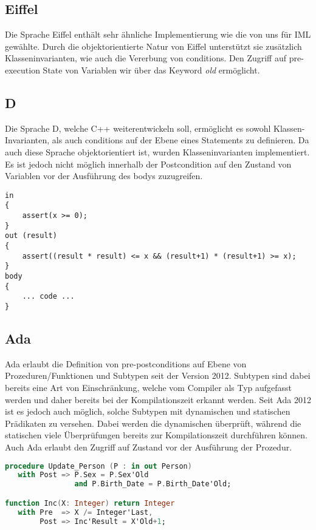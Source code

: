 \subsection{Eiffel}
Die Sprache Eiffel enthält sehr ähnliche Implementierung wie die von uns für IML gewählte. Durch
die objektorientierte Natur von Eiffel unterstützt sie zusätzlich Klasseninvarianten, wie auch die
Vererbung von conditions. Den Zugriff auf pre-execution State von Variablen wir über das 
Keyword \textit{old} ermöglicht.

\subsection{D}
Die Sprache D\cite{D:Main}, welche C++ weiterentwickeln soll, ermöglicht es sowohl Klassen-Invarianten,
als auch conditions auf der Ebene eines Statements zu definieren. Da auch diese Sprache objektorientiert 
ist, wurden Klasseninvarianten implementiert. Es ist jedoch nicht möglich innerhalb der Postcondition 
auf den Zustand von Variablen vor der Ausführung des bodys zuzugreifen.\newline

\begin{lstlisting}[caption=Beispiel in D]
in 
{ 
    assert(x >= 0);
} 
out (result) 
{
    assert((result * result) <= x && (result+1) * (result+1) >= x);
} 
body
{
    ... code ...
}
\end{lstlisting}

\subsection{Ada}
Ada erlaubt die Definition von pre-postconditions auf Ebene von Prozeduren/Funktionen und Subtypen 
seit der Version 2012. Subtypen sind
dabei bereits eine Art von Einschränkung, welche vom Compiler als Typ aufgefasst werden und daher bereits
bei der Kompilationszeit erkannt werden. Seit Ada 2012 ist es jedoch auch möglich, solche Subtypen 
mit dynamischen und statischen Prädikaten zu versehen. Dabei werden die dynamischen 
überprüft, während die statischen viele Überprüfungen bereits zur Kompilationszeit
 durchführen können. Auch 
Ada erlaubt den Zugriff auf Zustand vor der Ausführung der Prozedur. \newline

\begin{lstlisting}[caption=Beispiel in Ada 2012,language=Ada]
procedure Update_Person (P : in out Person)
   with Post => P.Sex = P.Sex'Old 
                and P.Birth_Date = P.Birth_Date'Old;

function Inc(X: Integer) return Integer
   with Pre  => X /= Integer'Last,
        Post => Inc'Result = X'Old+1;
\end{lstlisting}
